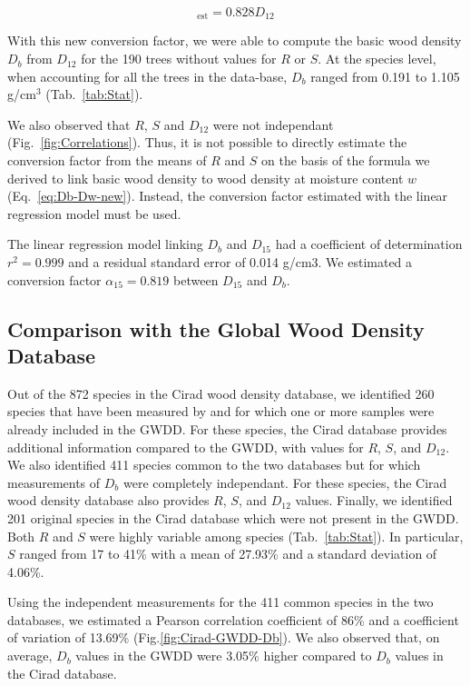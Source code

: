 \documentclass[a4paper, 12pt, leqno, dvipsnames]{article}\usepackage[]{graphicx}\usepackage[]{color}
\begin{document}
\begin{equation}
  [D_b]_{\text{est}}=0.828 D_{12} 
  \label{eq:Db-D12}
\end{equation}

With this new conversion factor, we were able to compute the basic wood density $D_b$ from $D_{12}$ for the 190 trees without values for $R$ or $S$. At the species level, when accounting for all the trees in the data-base, $D_b$ ranged from 0.191 to 1.105 g/cm$^3$ (Tab.~\ref{tab:Stat}).

We also observed that $R$, $S$ and $D_{12}$ were not independant (Fig.~\ref{fig:Correlations}). Thus, it is not possible to directly estimate the conversion factor from the means of $R$ and $S$ on the basis of the formula we derived to link basic wood density to wood density at moisture content $w$ (Eq.~\ref{eq:Db-Dw-new}). Instead, the conversion factor estimated with the linear regression model must be used.

The linear regression model linking $D_b$ and $D_{15}$ had a coefficient of determination $r^2=0.999$ and a residual standard error of 0.014 g/cm$3$. We estimated a conversion factor $\alpha_{15}=0.819$ between $D_{15}$ and $D_b$.

\subsection{Comparison with the Global Wood Density Database}

Out of the 872 species in the Cirad wood density database, we identified 260 species that have been measured by \citet{Sallenave1955,Sallenave1964,Sallenave1971} and for which one or more samples were already included in the GWDD. For these species, the Cirad database provides additional information compared to the GWDD, with values for $R$, $S$, and $D_{12}$. We also identified 411 species common to the two databases but for which measurements of $D_b$ were completely independant. For these species, the Cirad wood density database also provides $R$, $S$, and $D_{12}$ values. Finally, we identified 201 original species in the Cirad database which were not present in the GWDD. Both $R$ and $S$ were highly variable among species (Tab.~\ref{tab:Stat}). In particular, $S$ ranged from 17 to 41\% with a mean of 27.93\% and a standard deviation of 4.06\%.

Using the independent measurements for the 411 common species in the two databases, we estimated a Pearson correlation coefficient of 86\% and a coefficient of variation of 13.69\% (Fig.\ref{fig:Cirad-GWDD-Db}). We also observed that, on average, $D_b$ values in the GWDD were 3.05\% higher compared to $D_b$ values in the Cirad database.
\end{document}
